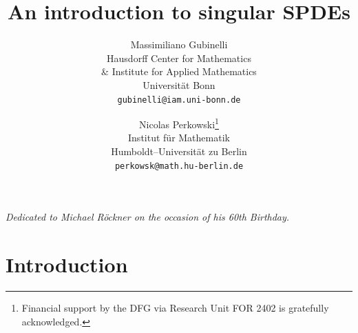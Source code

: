 \documentclass[a4paper, 11pt]{article}
\begin{document}
\title{An introduction to singular SPDEs}
\author{
  Massimiliano Gubinelli\\
  Hausdorff Center for Mathematics\\
   \& Institute for Applied Mathematics\\
   Universit{\"a}t Bonn \\
  \texttt{gubinelli@iam.uni-bonn.de}
  \and
  Nicolas Perkowski\thanks{Financial support by the DFG via Research Unit FOR 2402 is gratefully acknowledged.} \\
  Institut f\"ur Mathematik \\
  Humboldt--Universit\"at zu Berlin \\
  \texttt{perkowsk@math.hu-berlin.de}
}

%
%
\maketitle


\begin{center}
\emph{Dedicated to Michael R{\"o}ckner on the occasion of his 60th
  Birthday.}
\end{center}


\section{Introduction}
\end{document}
